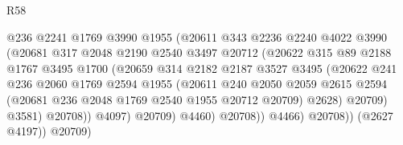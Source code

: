 \begin{lexlean}{R58}
\begin{coremodule}
                                  @236
                                  @2241
                                  @1769
                                  @3990
                                  @1955
                                  (@20611
                                    @343
                                    @2236
                                    @2240
                                    @4022
                                    @3990
                                    (@20681
                                      @317
                                      @2048
                                      @2190
                                      @2540
                                      @3497
                                      @20712
                                      (@20622
                                        @315
                                        @89
                                        @2188
                                        @1767
                                        @3495
                                        @1700
                                        (@20659
                                          @314
                                          @2182
                                          @2187
                                          @3527
                                          @3495
                                          (@20622
                                            @241
                                            @236
                                            @2060
                                            @1769
                                            @2594
                                            @1955
                                            (@20611
                                              @240
                                              @2050
                                              @2059
                                              @2615
                                              @2594
                                              (@20681 @236 @2048 @1769 @2540 @1955 @20712 @20709)
                                              @2628)
                                            @20709)
                                          @3581)
                                        @20708))
                                    @4097)
                                  @20709)
                                @4460)
                              @20708))
                          @4466)
                        @20708))
                    (@2627 @4197))
                  @20709)

\end{coremodule}
\end{lexlean}
